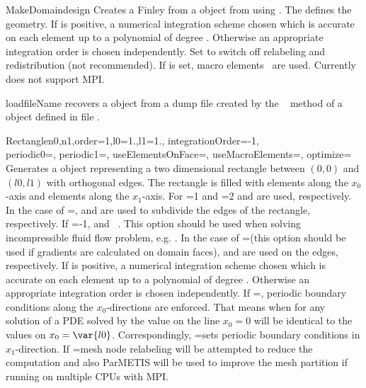 \begin{funcdesc}{MakeDomain}{design}
Creates a Finley \Domain from a  object from \pycad using \gmshextern.
The   defines the geometry.
If  is positive, a numerical integration scheme
chosen which is accurate on each element up to a polynomial of
degree  . Otherwise
an appropriate integration order is chosen independently.
Set  to switch off relabeling and redistribution (not recommended).
If  is set, macro elements~ are used.
Currently  does not support MPI.
\end{funcdesc}


\begin{funcdesc}{load}{fileName}
recovers a \Domain object from a dump file created by the \
 method of a \Domain object defined in
file .
\end{funcdesc}


\begin{funcdesc}{Rectangle}{n0,n1,order=1,l0=1.,l1=1., integrationOrder=-1, \\
  periodic0=\False, periodic1=\False, useElementsOnFace=\False, useMacroElements=\False, optimize=\False}
Generates a \Domain object representing a two dimensional rectangle between
$(0,0)$ and $(l0,l1)$ with orthogonal edges. The rectangle is filled with
\var{n0} elements along the $x_0$-axis and
 elements along the $x_1$-axis.
For =1 and \var{order}=2
 and
 are used, respectively.
In the case of =\False,
 and
 are used to subdivide the edges of the rectangle, respectively.
If \var{order}=-1, \finleyelement{Rec8Macro} and \finleyelement{Line3Macro}~. This option should be used when solving incompressible fluid flow problem, e.g. .
In the case of \var{useElementsOnFace}=\True (this option should be used if gradients
are calculated on domain faces),
 and
 are used on the edges, respectively.
If  is positive, a numerical integration scheme
chosen which is accurate on each element up to a polynomial of
degree  . Otherwise
an appropriate integration order is chosen independently. If
=\True, periodic boundary conditions 
along the $x_0$-directions are enforced. That means when for any solution of a PDE solved by \finley
the value on the line $x_0=0$ will be identical to the values on $x_0=\var{l0}$.
Correspondingly,
=\False sets periodic boundary conditions
in $x_1$-direction.
If =\True mesh node relabeling will be attempted to reduce the computation and also ParMETIS will be used to improve the mesh partition if running on multiple CPUs with MPI.
\end{funcdesc}

